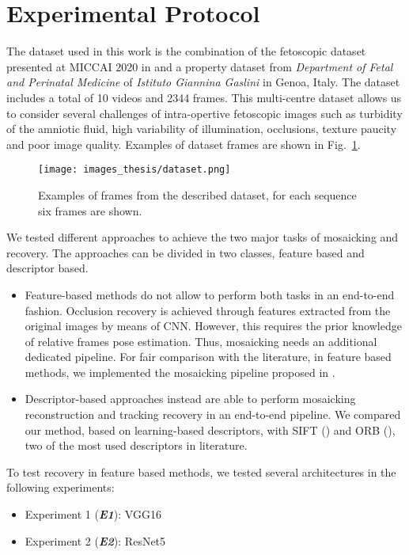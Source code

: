 \documentclass[sn-basic]{sn-jnl}%
\begin{document}
\section{Experimental Protocol}\label{sec:exp}
The dataset used in this work is the combination of the fetoscopic dataset presented at MICCAI 2020 in \cite{Bano2020} and a property dataset from \textit{Department of Fetal and Perinatal Medicine} of \textit{Istituto Giannina Gaslini} in Genoa, Italy. 
The dataset includes a total of 10 videos and 2344 frames. 
This multi-centre dataset allows us to consider several challenges of intra-opertive fetoscopic images such as turbidity of the amniotic fluid, high variability of illumination, occlusions, texture paucity and poor image quality.
Examples of dataset frames are shown in Fig.~\ref{fig:ex_dataset}.

\begin{figure}[t!]
\centering
\texttt{[image: images\_thesis/dataset.png]}
\caption{Examples of frames from the described dataset, for each sequence six frames are shown.}
\label{fig:ex_dataset}
\end{figure}

We tested different approaches to achieve the two major tasks of mosaicking and recovery. The approaches can be divided in two classes, feature based and descriptor based. 
\begin{itemize}
 \item Feature-based methods do not allow to perform both tasks in an end-to-end fashion. Occlusion recovery is achieved through features extracted from the original images by means of CNN. However, this requires the prior knowledge of relative frames pose estimation. Thus, mosaicking needs an additional dedicated pipeline. For fair comparison with the literature, in feature based methods, we implemented the mosaicking pipeline proposed in \cite{BanoMosaicking2020}.
\item Descriptor-based approaches instead are able to perform mosaicking reconstruction and tracking recovery in an end-to-end pipeline. We compared our method, based on learning-based descriptors, with SIFT (\cite{Lowe1999}) and ORB (\cite{Rublee2011}), two of the most used descriptors in literature.
\end{itemize}

To test recovery in feature based methods, we tested several architectures in the following experiments:
\begin{itemize}
    \item Experiment 1 (\textit{\textbf{E1}}): VGG16 
    \item Experiment 2 (\textit{\textbf{E2}}): ResNet5
\end{itemize}
\end{document}
